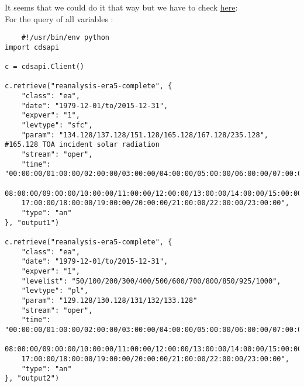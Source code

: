 It seems that we could do it that way but we have to check \href{https://cds.climate.copernicus.eu/cdsapp#!/dataset/reanalysis-era5-complete?tab=form}{here}: \\

For the query of all variables : 
\scriptsize
\begin{Verbatim}
    #!/usr/bin/env python
import cdsapi

c = cdsapi.Client()

c.retrieve("reanalysis-era5-complete", {
    "class": "ea",
    "date": "1979-12-01/to/2015-12-31",
    "expver": "1",
    "levtype": "sfc",
    "param": "134.128/137.128/151.128/165.128/167.128/235.128",  #165.128 TOA incident solar radiation
    "stream": "oper",
    "time": "00:00:00/01:00:00/02:00:00/03:00:00/04:00:00/05:00:00/06:00:00/07:00:00/
    08:00:00/09:00:00/10:00:00/11:00:00/12:00:00/13:00:00/14:00:00/15:00:00/16:00:00/
    17:00:00/18:00:00/19:00:00/20:00:00/21:00:00/22:00:00/23:00:00",
    "type": "an"
}, "output1")

c.retrieve("reanalysis-era5-complete", {
    "class": "ea",
    "date": "1979-12-01/to/2015-12-31",
    "expver": "1",
    "levelist": "50/100/200/300/400/500/600/700/800/850/925/1000",
    "levtype": "pl",
    "param": "129.128/130.128/131/132/133.128"
    "stream": "oper",
    "time": "00:00:00/01:00:00/02:00:00/03:00:00/04:00:00/05:00:00/06:00:00/07:00:00/
    08:00:00/09:00:00/10:00:00/11:00:00/12:00:00/13:00:00/14:00:00/15:00:00/16:00:00/
    17:00:00/18:00:00/19:00:00/20:00:00/21:00:00/22:00:00/23:00:00",
    "type": "an"
}, "output2")

\end{Verbatim}
\normalsize